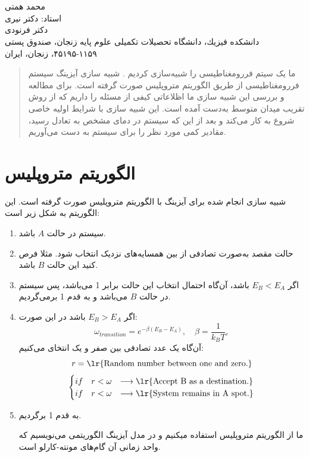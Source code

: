 \documentclass[a4paper,12pt]{article}
\begin{document}
\date{}

\begin{center}
\fontsize{25pt}{25pt}\selectfont{شبیه سازی شبکه آیزینگ دو‌بعدی با روش مونته-کارلو}\\
\end{center}
\begin{center}
\\
محمد همتی \\
استاد: دکتر نیری \\
 دکتر فرنودی\\
\medskip
\large{
دانشكده فیزیك، دانشگاه تحصیلات تكمیلی علوم پایه زنجان، صندوق پستی ۱۱۵۹-۴۵۱۹۵، زنجان، ایران}
\end{center}
\bigskip


\begin{abstract}
ما یک سیتم فررومغناطیسی را شبیه‌سازی کردیم . شبیه سازی آیزینگ سیستم
فررومغناطیسی از طریق الگوریتم متروپلیس صورت‌ گرفته است.
برای مطالعه و بررسی این شبیه سازی ما اظلاعاتی کیفی از
مسئله را داریم که از روش تقریب میدان متوسط به‌دست آمده است.
این شبیه سازی با شرایط اولیه خاصی شروع به کار می‌کند و
بعد از این که سیستم در دمای مشخص به تعادل رسید، مقادیر کمی
مورد نظر را برای سیستم به دست می‌آوریم.

\end{abstract}
\section{الگوریتم متروپلیس}
شبیه سازی انجام شده برای آیزینگ با الگوریتم متروپلیس صورت گرفته است.
این الگوریتم به شکل زیر است:
\begin{enumerate}
 \item سیستم در حالت 
 $A$
 باشد.
 \item حالت مقصد به‌صورت تصادفی از بین همسایه‌های نزدیک انتخاب شود. 
 مثلا فرص کنید این حالت 
 $B$
 باشد.
 \item اگر $E_B<E_A$
 باشد، آن‌گاه احتمال انتخاب این حالت برابر 1 می‌باشد، پس
 سیستم در حالت $B$ می‌باشد و به قدم 1 برمی‌گردیم.
 \item اگر
 $E_B>E_A$
 باشد در این صورت:
 $$
 \omega_{transition}=e^{-\beta(E_B-E_A)} ,\quad \beta=\frac{1}{k_BT},
 $$
 آن‌گاه یک عدد تصادفی بین صفر و یک انتخای می‌کنیم:
 $$
 r=\text{\lr{Random number between one and zero.}}
 $$
 $$
\begin{cases}
 if\quad r<\omega& \longrightarrow \text{\lr{Accept B as a destination.}}\\
 if\quad r<\omega& \longrightarrow \text{\lr{System remains in A spot.}}
\end{cases}
$$
 \item به قدم 1 برگردیم.
 
ما از الگوریتم متروپلیس استفاده میکنیم و در مدل آیزینگ الگوریتمی
می‌نویسیم که واحد زمانی آن گام‌های مونته-کارلو است.
\end{enumerate}
\end{document}
